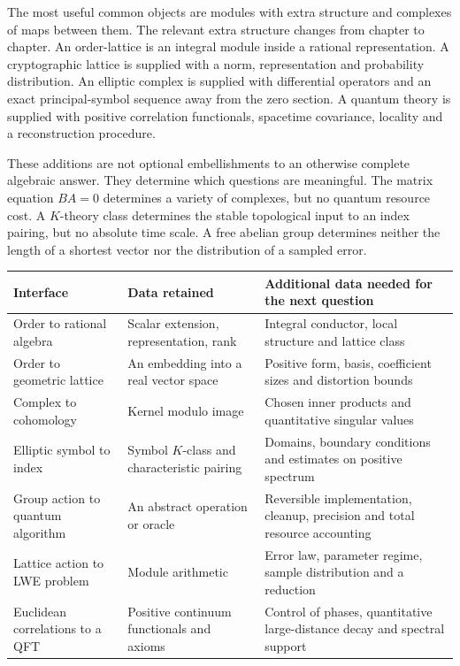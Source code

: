 The most useful common objects are modules with extra structure and complexes
of maps between them. The relevant extra structure changes from chapter to
chapter. An order-lattice is an integral module inside a rational
representation. A cryptographic lattice is supplied with a norm,
representation and probability distribution. An elliptic complex is supplied
with differential operators and an exact principal-symbol sequence away from
the zero section. A quantum theory is supplied with positive correlation
functionals, spacetime covariance, locality and a reconstruction procedure.

These additions are not optional embellishments to an otherwise complete
algebraic answer. They determine which questions are meaningful. The matrix
equation $BA=0$ determines a variety of complexes, but no quantum resource
cost. A $K$-theory class determines the stable topological input to an index
pairing, but no absolute time scale. A free abelian group determines neither
the length of a shortest vector nor the distribution of a sampled error.

\begin{longtable}{p{}p{}p{}}
\toprule
Interface & Data retained & Additional data needed for the next question\\
\midrule\endhead
Order to rational algebra & Scalar extension, representation, rank & Integral
conductor, local structure and lattice class\\
Order to geometric lattice & An embedding into a real vector space & Positive
form, basis, coefficient sizes and distortion bounds\\
Complex to cohomology & Kernel modulo image & Chosen inner products and
quantitative singular values\\
Elliptic symbol to index & Symbol $K$-class and characteristic pairing & Domains,
boundary conditions and estimates on positive spectrum\\
Group action to quantum algorithm & An abstract operation or oracle & Reversible
implementation, cleanup, precision and total resource accounting\\
Lattice action to LWE problem & Module arithmetic & Error law, parameter regime,
sample distribution and a reduction\\
Euclidean correlations to a QFT & Positive continuum functionals and axioms &
Control of phases, quantitative large-distance decay and spectral support\\
\bottomrule
\end{longtable}

